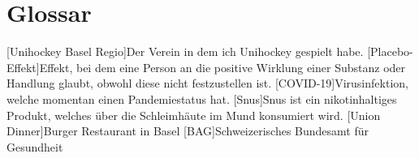 \chapter{Glossar}

\begin{acronym}
  [Unihockey Basel Regio]{Der Verein in dem ich Unihockey gespielt habe.}
  [Placebo-Effekt]{Effekt, bei dem eine Person an die positive Wirklung einer Substanz oder Handlung glaubt, obwohl diese nicht festzustellen ist.}
  [COVID-19]{Virusinfektion, welche momentan einen Pandemiestatus hat.}
  [Snus]{Snus ist ein nikotinhaltiges Produkt, welches über die Schleimhäute im Mund konsumiert wird.}
  [Union Dinner]{Burger Restaurant in Basel}
  [BAG]{Schweizerisches Bundesamt für Gesundheit}
\end{acronym}
